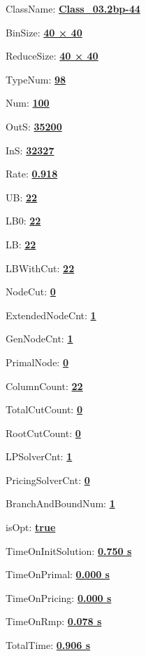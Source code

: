 \documentclass[11pt]{article}
\begin{document}
\pagestyle{empty}


ClassName: \underline{\textbf{Class_03.2bp-44}}
\par
BinSize: \underline{\textbf{40 × 40}}
\par
ReduceSize: \underline{\textbf{40 × 40}}
\par
TypeNum: \underline{\textbf{98}}
\par
Num: \underline{\textbf{100}}
\par
OutS: \underline{\textbf{35200}}
\par
InS: \underline{\textbf{32327}}
\par
Rate: \underline{\textbf{0.918}}
\par
UB: \underline{\textbf{22}}
\par
LB0: \underline{\textbf{22}}
\par
LB: \underline{\textbf{22}}
\par
LBWithCut: \underline{\textbf{22}}
\par
NodeCut: \underline{\textbf{0}}
\par
ExtendedNodeCnt: \underline{\textbf{1}}
\par
GenNodeCnt: \underline{\textbf{1}}
\par
PrimalNode: \underline{\textbf{0}}
\par
ColumnCount: \underline{\textbf{22}}
\par
TotalCutCount: \underline{\textbf{0}}
\par
RootCutCount: \underline{\textbf{0}}
\par
LPSolverCnt: \underline{\textbf{1}}
\par
PricingSolverCnt: \underline{\textbf{0}}
\par
BranchAndBoundNum: \underline{\textbf{1}}
\par
isOpt: \underline{\textbf{true}}
\par
TimeOnInitSolution: \underline{\textbf{0.750 s}}
\par
TimeOnPrimal: \underline{\textbf{0.000 s}}
\par
TimeOnPricing: \underline{\textbf{0.000 s}}
\par
TimeOnRmp: \underline{\textbf{0.078 s}}
\par
TotalTime: \underline{\textbf{0.906 s}}
\par
\newpage


\end{document}

